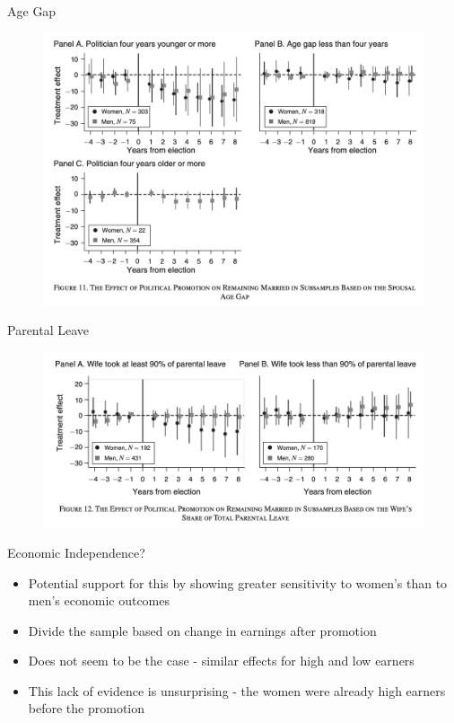 \documentclass[11pt,notes=hide,aspectratio=169,mathserif]{beamer}
\begin{document}
\begin{frame}{Age Gap}
\small
\begin{figure}
  \centering
  \includegraphics[width=0.8\linewidth]{inputs/fig8.png}
  \end{figure}
\end{frame}

\begin{frame}{Parental Leave}
\small
\begin{figure}
  \centering
  \includegraphics[width=0.8\linewidth]{inputs/fig9.png}
  \end{figure}
\end{frame}

\begin{frame}{Economic Independence?}
\small
\begin{itemize}
  \item Potential support for this by showing greater sensitivity to women’s than to men’s economic outcomes
  \item Divide the sample based on change in earnings after promotion
  \item Does not seem to be the case - similar effects for high and low earners
  \item This lack of evidence is unsurprising - the women were already high earners before the promotion
\end{itemize}
\end{frame}
\end{document}
